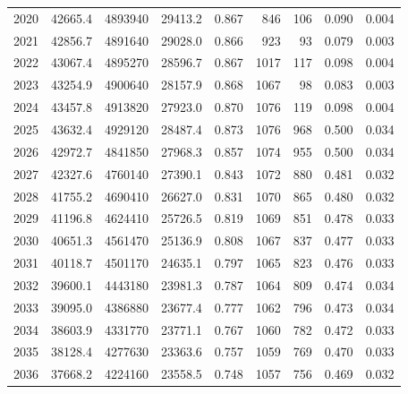 \documentclass[
]{scrartcl}
\begin{document}
\begin{table}
{\begin{tabular*}{\linewidth}{@{\extracolsep{\fill}}rrrrrrrrr}
2020 & 42665.4 & 4893940 & 29413.2 & 0.867 & 846 & 106 & 0.090 & 0.004 \\ 
2021 & 42856.7 & 4891640 & 29028.0 & 0.866 & 923 & 93 & 0.079 & 0.003 \\ 
2022 & 43067.4 & 4895270 & 28596.7 & 0.867 & 1017 & 117 & 0.098 & 0.004 \\ 
2023 & 43254.9 & 4900640 & 28157.9 & 0.868 & 1067 & 98 & 0.083 & 0.003 \\ 
2024 & 43457.8 & 4913820 & 27923.0 & 0.870 & 1076 & 119 & 0.098 & 0.004 \\ 
2025 & 43632.4 & 4929120 & 28487.4 & 0.873 & 1076 & 968 & 0.500 & 0.034 \\ 
2026 & 42972.7 & 4841850 & 27968.3 & 0.857 & 1074 & 955 & 0.500 & 0.034 \\ 
2027 & 42327.6 & 4760140 & 27390.1 & 0.843 & 1072 & 880 & 0.481 & 0.032 \\ 
2028 & 41755.2 & 4690410 & 26627.0 & 0.831 & 1070 & 865 & 0.480 & 0.032 \\ 
2029 & 41196.8 & 4624410 & 25726.5 & 0.819 & 1069 & 851 & 0.478 & 0.033 \\ 
2030 & 40651.3 & 4561470 & 25136.9 & 0.808 & 1067 & 837 & 0.477 & 0.033 \\ 
2031 & 40118.7 & 4501170 & 24635.1 & 0.797 & 1065 & 823 & 0.476 & 0.033 \\ 
2032 & 39600.1 & 4443180 & 23981.3 & 0.787 & 1064 & 809 & 0.474 & 0.034 \\ 
2033 & 39095.0 & 4386880 & 23677.4 & 0.777 & 1062 & 796 & 0.473 & 0.034 \\ 
2034 & 38603.9 & 4331770 & 23771.1 & 0.767 & 1060 & 782 & 0.472 & 0.033 \\ 
2035 & 38128.4 & 4277630 & 23363.6 & 0.757 & 1059 & 769 & 0.470 & 0.033 \\ 
2036 & 37668.2 & 4224160 & 23558.5 & 0.748 & 1057 & 756 & 0.469 & 0.032 \\ 
\bottomrule
\end{tabular*}

}

\end{table}%

\newpage{}

\begingroup
\fontsize{9.0pt}{10.8pt}\selectfont
\end{document}
